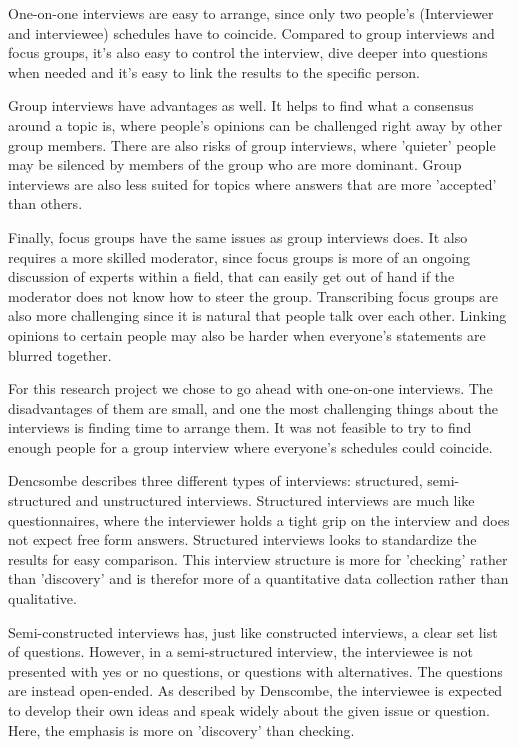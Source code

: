 \documentclass[11pt]{article}
\begin{document}
\begin{multicols}{2}
{    One-on-one interviews are easy to arrange, since
    only two people's (Interviewer and interviewee) schedules have to coincide.
    Compared to group interviews and focus groups, it's also easy to control the interview,
    dive deeper into questions when needed and it's easy to link the results
    to the specific person.

    Group interviews have advantages as well. It helps to find what a consensus around
    a topic is, where people's opinions can be challenged right away by other group members.
    There are also risks of group interviews, where 'quieter' people may be silenced by
    members of the group who are more dominant. Group interviews are also less suited
    for topics where answers that are more 'accepted' than others.

    Finally, focus groups have the same issues as group interviews does. It also
    requires a more skilled moderator, since focus groups is more of an ongoing
    discussion of experts within a field, that can easily get out of hand if the
    moderator does not know how to steer the group.  Transcribing focus groups are also
    more challenging since it is natural that people talk over each other. Linking opinions
    to certain people may also be harder when everyone's statements are blurred together.

    For this research project we chose to go ahead with one-on-one interviews.
    The disadvantages of them are small, and one the most challenging things
    about the interviews is finding time to arrange them. It was not feasible
    to try to find enough people for a group interview where everyone's schedules
    could coincide.

    Dencsombe describes three different types of interviews: structured, semi-structured and
    unstructured interviews. Structured interviews are much like questionnaires, where
    the interviewer holds a tight grip on the interview and does not expect free form answers.
    Structured interviews looks to standardize the results for easy comparison.
    This interview structure is more for 'checking' rather than 'discovery' and is
    therefor more of a quantitative data collection rather than qualitative.

    Semi-constructed interviews has, just like constructed interviews, a clear set
    list of questions. However, in a semi-structured interview, the interviewee
    is not presented with yes or no questions, or questions with alternatives.
    The questions are instead open-ended. As described by Denscombe, the interviewee
    is expected to develop their own ideas and speak widely about the given issue or question.
    Here, the emphasis is more on 'discovery' than checking.

}
\end{multicols}
\end{document}

